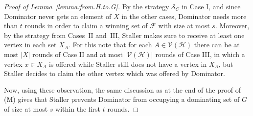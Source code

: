 \documentclass[10pt,a4paper]{amsart}
\newcommand{\calH}{\mathcal{H}}
\newcommand{\calV}{\mathcal{V}}
\begin{document}
\begin{proof}[Proof of Lemma~\ref{lemma:from.H.to.G}]
By the strategy $\mathcal{S}_C$ in Case I,
and since Dominator never gets an element of $X$ in the other cases,
Dominator needs more than $t$ rounds in order to claim
a winning set of $\mathcal{F}$ with size at most $s$.
Moreover, by the strategy from Cases~II and~III,
Staller makes sure to receive at least one vertex in each set $X_A$.
For this note that for each $A\in \calV(\calH)$ there can be at 
most $|X|$ rounds of Case II and at
most $|\calV(\calH)|$ rounds of Case III, in which a vertex $x\in X_A$ is offered while Staller still does not have a vertex in $X_A$, but Staller decides to claim the other vertex which was offered by Dominator.

Now, using these observation, the same discussion as at the end of the proof of (M) gives that
Staller prevents Dominator from occupying a dominating set of $G$ of size at most $s$ within the first $t$ rounds.
\end{proof}
\end{document}
